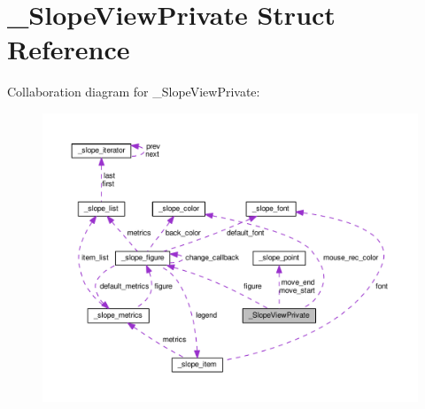 \hypertarget{struct__SlopeViewPrivate}{\section{\+\_\+\+Slope\+View\+Private Struct Reference}
\label{struct__SlopeViewPrivate}
}


Collaboration diagram for \+\_\+\+Slope\+View\+Private\+:
\nopagebreak
\begin{figure}[H]
\begin{center}
\leavevmode
\includegraphics[width=350pt]{struct__SlopeViewPrivate__coll__graph}
\end{center}
\end{figure}

